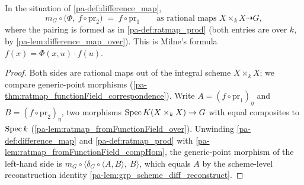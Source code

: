 \begin{theorem}
  \label{pa-thm:difference_reconstruct}
  \leanok

  In the situation of \ref{pa-def:difference_map},
  \[
    m_G \circ \bigl(\Phi,\ f \circ \mathrm{pr}_2\bigr)
    \;=\; f \circ \mathrm{pr}_1
    \qquad\text{as rational maps } X \times_k X \dashrightarrow G,
  \]
  where the pairing is formed as in \ref{pa-def:ratmap_prod} (both entries are over
  \(k\), by \ref{pa-lem:difference_map_over}). This is Milne's formula
  \(f(x) = \Phi(x, u) \cdot f(u)\).
\end{theorem}
\begin{proof}
  \leanok
  Both sides are rational maps out of the integral scheme \(X \times_k X\); we
  compare generic-point morphisms
  (\ref{pa-thm:ratmap_functionField_correspondence}). Write
  \(A = (f \circ \mathrm{pr}_1)_\eta\) and \(B = (f \circ \mathrm{pr}_2)_\eta\),
  two morphisms \(\operatorname{Spec} K(X \times_k X) \to G\) with equal composites to
  \(\operatorname{Spec} k\) (\ref{pa-lem:ratmap_fromFunctionField_over}). Unwinding
  \ref{pa-def:difference_map} and \ref{pa-def:ratmap_prod} with
  \ref{pa-lem:ratmap_fromFunctionField_compHom}, the generic-point morphism of the
  left-hand side is
  \(m_G \circ \bigl\langle \delta_G \circ \langle A, B\rangle,\ B\bigr\rangle\),
  which equals \(A\) by the scheme-level reconstruction identity
  \ref{pa-lem:grp_scheme_diff_reconstruct}.
\end{proof}

